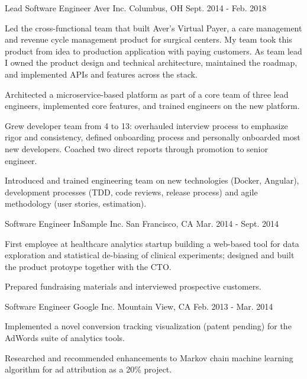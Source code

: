 \begin{cventries}
  \cventry
    {Lead Software Engineer} %
    {Aver Inc.} %
    {Columbus, OH} %
    {Sept. 2014 - Feb. 2018} %
    {
      \begin{cvitems} %
        \item {Led the cross-functional team that built Aver's Virtual Payer, a care management and revenue cycle management product for surgical centers.
        My team took this product from idea to production application with paying customers.
        As team lead I owned the product design and technical architecture, maintained the roadmap, and implemented APIs and features across the stack.}
        \item {Architected a microservice-based platform as part of a core team of three lead engineers, implemented core features, and trained engineers on the new platform.}
        \item {Grew developer team from 4 to 13: overhauled interview process to emphasize rigor and consistency, defined onboarding process and personally onboarded most new developers. Coached two direct reports through promotion to senior engineer.}
        \item {Introduced and trained engineering team on new technologies (Docker, Angular), development processes (TDD, code reviews, release process) and agile methodology (user stories, estimation).}
      \end{cvitems}
    }

  \cventry
    {Software Engineer} %
    {InSample Inc.} %
    {San Francisco, CA} %
    {Mar. 2014 - Sept. 2014} %
    {
      \begin{cvitems} %
        \item {First employee at healthcare analytics startup building a web-based tool for data exploration and statistical de-biasing of clinical experiments; designed and built the product protoype together with the CTO.}
        \item {Prepared fundraising materials and interviewed prospective customers.}
      \end{cvitems}
    }

  \cventry
    {Software Engineer} %
    {Google Inc.} %
    {Mountain View, CA} %
    {Feb. 2013 - Mar. 2014} %
    {
      \begin{cvitems} %
        \item {Implemented a novel conversion tracking visualization (patent pending) for the AdWords suite of analytics tools.}
        \item {Researched and recommended enhancements to Markov chain machine learning algorithm for ad attribution as a 20\% project.}
      \end{cvitems}
    }


\end{cventries}
